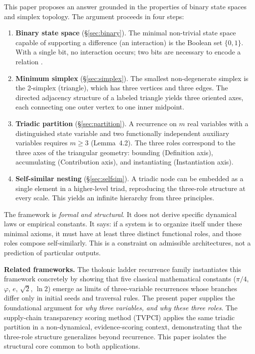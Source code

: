 \documentclass[12pt]{article}
\theoremstyle{definition}
\theoremstyle{remark}
\begin{document}
This paper proposes an answer grounded in the properties of binary state spaces and
simplex topology.  The argument proceeds in four steps:
\begin{enumerate}
  \item \textbf{Binary state space} (\S\ref{sec:binary}).  The minimal non-trivial state
        space capable of supporting a difference (an interaction) is the Boolean set
        $\{0,1\}$.  With a single bit, no interaction occurs; two bits are necessary to
        encode a relation \cite{Sha48}.
  \item \textbf{Minimum simplex} (\S\ref{sec:simplex}).  The smallest non-degenerate
        simplex is the 2-simplex (triangle), which has three vertices and three edges.
        The directed adjacency structure of a labeled triangle yields three oriented
        axes, each connecting one outer vertex to one inner midpoint.
  \item \textbf{Triadic partition} (\S\ref{sec:partition}).  A recurrence on $m$ real
        variables with a distinguished state variable and two functionally independent
        auxiliary variables requires $m \ge 3$ (Lemma~4.2).  The three roles correspond
        to the three axes of the triangular geometry: bounding (Definition axis),
        accumulating (Contribution axis), and instantiating (Instantiation axis).
  \item \textbf{Self-similar nesting} (\S\ref{sec:selfsim}).  A triadic node can be
        embedded as a single element in a higher-level triad, reproducing the three-role
        structure at every scale.  This yields an infinite hierarchy from three principles.
\end{enumerate}

The framework is \emph{formal and structural}.  It does not derive specific dynamical
laws or empirical constants.  It says: if a system is to organize itself under these
minimal axioms, it must have at least three distinct functional roles, and those roles
compose self-similarly.  This is a constraint on admissible architectures, not a
prediction of particular outputs.

\textbf{Related frameworks.}  The tholonic ladder recurrence family \cite{Mil24}
instantiates this framework concretely by showing that five classical mathematical
constants ($\pi/4$, $\varphi$, $e$, $\sqrt{2}$, $\ln 2$) emerge as limits of
three-variable recurrences whose branches differ only in initial seeds and traversal
rules.  The present paper supplies the foundational argument for \emph{why three
variables, and why these three roles}.  The supply-chain transparency scoring method
(TVPCI) \cite{Mil24} applies the same triadic partition in a non-dynamical,
evidence-scoring context, demonstrating that the three-role structure generalizes
beyond recurrence.  This paper isolates the structural core common to both applications.
\end{document}
